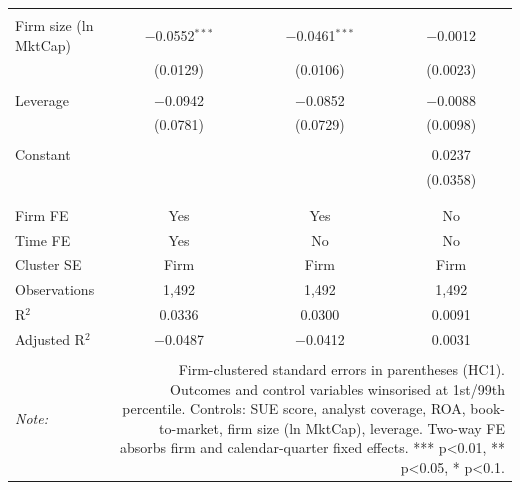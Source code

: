 \begin{table}[!htbp]
\begin{tabular}{@{\extracolsep{5pt}}lccc}
  & & & \\ 
 Firm size (ln MktCap) & $-$0.0552$^{***}$ & $-$0.0461$^{***}$ & $-$0.0012 \\ 
  & (0.0129) & (0.0106) & (0.0023) \\ 
  & & & \\ 
 Leverage & $-$0.0942 & $-$0.0852 & $-$0.0088 \\ 
  & (0.0781) & (0.0729) & (0.0098) \\ 
  & & & \\ 
 Constant &  &  & 0.0237 \\ 
  &  &  & (0.0358) \\ 
  & & & \\ 
\hline \\[-1.8ex] 
Firm FE & Yes & Yes & No \\ 
Time FE & Yes & No & No \\ 
Cluster SE & Firm & Firm & Firm \\ 
Observations & 1,492 & 1,492 & 1,492 \\ 
R$^{2}$ & 0.0336 & 0.0300 & 0.0091 \\ 
Adjusted R$^{2}$ & $-$0.0487 & $-$0.0412 & 0.0031 \\ 
\hline 
\hline \\[-1.8ex] 
\textit{Note:}  & \multicolumn{3}{r}{Firm-clustered standard errors in parentheses (HC1). Outcomes and control variables winsorised at 1st/99th percentile. Controls: SUE score, analyst coverage, ROA, book-to-market, firm size (ln MktCap), leverage. Two-way FE absorbs firm and calendar-quarter fixed effects. *** p<0.01, ** p<0.05, * p<0.1.} \\ 
\end{tabular} 
\end{table} 
